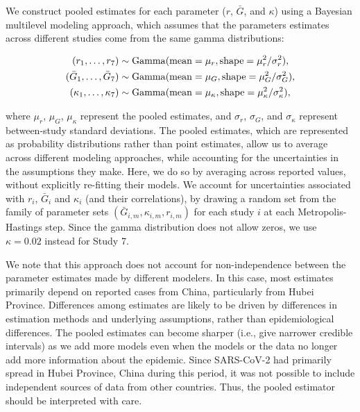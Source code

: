 \documentclass[12pt]{article}
\begin{document}
We construct pooled estimates for each parameter ($r$, $\bar G$, and $\kappa$) using a Bayesian multilevel modeling approach, which assumes that the parameters estimates across different studies come from the same gamma distributions:
\begin{linenomath*}
\begin{equation}
\begin{aligned}
(r_1, \dots, r_7) &\sim \mathrm{Gamma}(\mathrm{mean}=\mu_r, \mathrm{shape}=\mu_r^2/\sigma_r^2),\\
(\bar{G}_1, \dots, \bar{G}_7) &\sim \mathrm{Gamma}(\mathrm{mean}=\mu_G, \mathrm{shape}=\mu_G^2/\sigma_G^2),\\
(\kappa_1, \dots, \kappa_7) &\sim \mathrm{Gamma}(\mathrm{mean}=\mu_\kappa, \mathrm{shape}=\mu_\kappa^2/\sigma_\kappa^2),\\
\end{aligned}
\end{equation}
\end{linenomath*}
where $\mu_r$, $\mu_G$, $\mu_\kappa$ represent the pooled estimates, and $\sigma_r$, $\sigma_G$, and $\sigma_\kappa$ represent between-study standard deviations.
The pooled estimates, which are represented as probability distributions rather than point estimates, allow us to average across different modeling approaches, while accounting for the uncertainties in the assumptions they make.
Here, we do so by averaging across reported values, without explicitly re-fitting their models.
We account for uncertainties associated with $r_i$, $\bar G_i$ and $\kappa_i$ (and their correlations), by drawing a random set from the family of parameter sets $(\bar{G}_{i,m}, \kappa_{i,m}, r_{i,m})$ for each study $i$ at each Metropolis-Hastings step.
Since the gamma distribution does not allow zeros, we use $\kappa=0.02$ instead for Study 7.

We note that this approach does not account for non-independence between the parameter estimates made by different modelers.
In this case, most estimates primarily depend on reported cases from China, particularly from Hubei Province.
Differences among estimates are likely to be driven by differences in estimation methods and underlying assumptions, rather than epidemiological differences.
The pooled estimates can become sharper (i.e., give narrower credible intervals) as we add more models even when the models or the data no longer add more information about the epidemic.
Since SARS-CoV-2 had primarily spread in Hubei Province, China during this period, it was not possible to include independent sources of data from other countries.
Thus, the pooled estimator should be interpreted with care.
\end{document}
